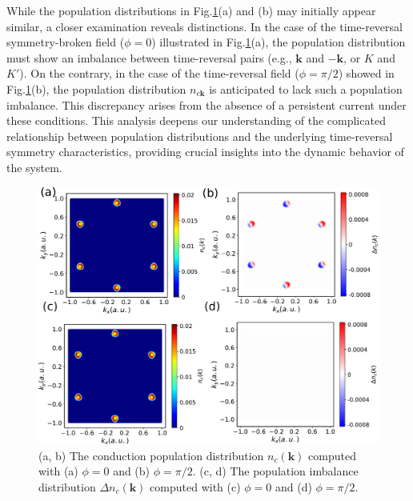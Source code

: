 While the population distributions in Fig.\ref{fig:population}(a) and (b) may initially appear similar, a closer examination reveals distinctions. In the case of the time-reversal symmetry-broken field ($\phi=0$) illustrated in Fig.\ref{fig:population}(a), the population distribution must show an imbalance between time-reversal pairs (e.g., $\mathbf{k}$ and $-\mathbf{k}$, or $K$ and $K'$). On the contrary, in the case of the time-reversal field ($\phi=\pi/2$) showed in Fig.\ref{fig:population}(b), the population distribution $n_{c\mathbf{k}}$ is anticipated to lack such a population imbalance. This discrepancy arises from the absence of a persistent current under these conditions. This analysis deepens our understanding of the complicated relationship between population distributions and the underlying time-reversal symmetry characteristics, providing crucial insights into the dynamic behavior of the system.

\begin{figure}[htbp]
\centering
 \includegraphics[width=1.0\linewidth]{pic/population.pdf}
\caption{\label{fig:population} 
(a, b) The conduction population distribution $n_c(\mathbf k)$ computed with (a) $\phi=0$ and (b) $\phi=\pi/2$. (c, d) The population imbalance distribution $\Delta n_c(\mathbf k)$ computed with (c) $\phi=0$ and (d) $\phi=\pi/2$.}
\end{figure}


